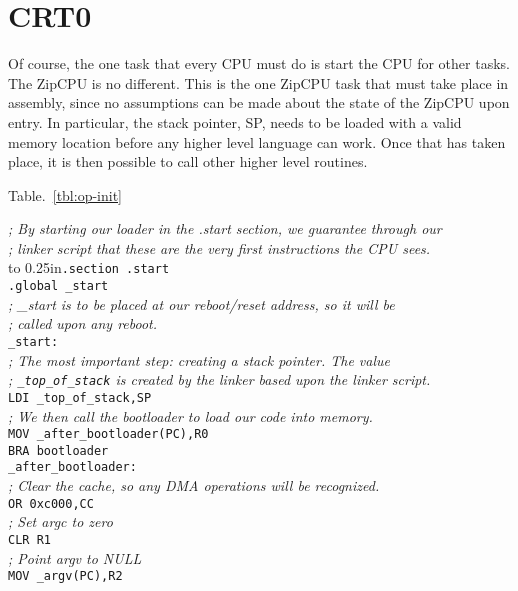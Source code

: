 \documentclass{gqtekspec}
\begin{document}
\section{CRT0}
Of course, the one task that every CPU must do is start the CPU for other
tasks.  The ZipCPU is no different.  This is the one ZipCPU task that must
take place in assembly, since no assumptions can be made about the state of
the ZipCPU upon entry.  In particular, the stack pointer, SP, needs to be
loaded with a valid memory location before any higher level language can work.
Once that has taken place, it is then possible to call other higher level
routines.

Table.~\ref{tbl:op-init}
\begin{table}\begin{center}
\begin{tabbing}
{\em ; By starting our loader in the .start section, we guarantee through our}\\
{\em ; linker script that these are the very first instructions the CPU sees.}\\
\hbox to 0.25in{}\={\tt .section .start} \\
\>	{\tt .global \_start} \\
{\em ; \_start is to be placed at our reboot/reset address, so it will be}\\
{\em ; called upon any reboot.}\\
{\tt \_start:} \\
%
%
\> {\em ; The most important step: creating a stack pointer.  The value}\\
\> {\em ; {\tt \_top\_of\_stack} is created by the linker based upon the linker script.}\\
\>	{\tt LDI \_top\_of\_stack,SP} \\
%
%
\> {\em ; We then call the bootloader to load our code into memory.}\\
\>	{\tt MOV \_after\_bootloader(PC),R0} \\
\>	{\tt BRA bootloader} \\
{\tt \_after\_bootloader:} \\
%
%
\>	{\em ; Clear the cache, so any DMA operations will be recognized.}\\
\>	{\tt OR	0xc000,CC} \\
%
\>	{\em ; Set argc to zero}\\
\>	{\tt CLR	R1} \\
\>	{\em ; Point argv to NULL}\\
\>	{\tt MOV	\_argv(PC),R2} \\

\end{tabbing}
\end{center}
\end{table}
\end{document}

